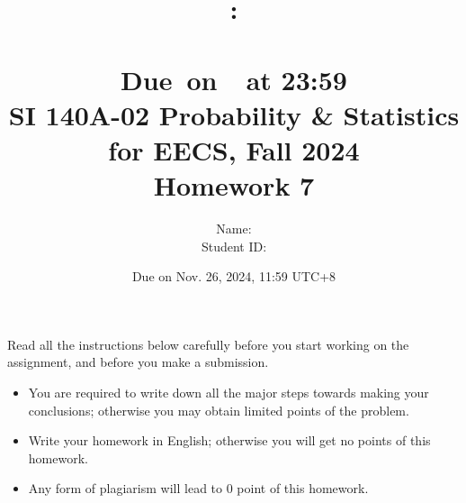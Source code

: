 \documentclass[a4paper]{article}
\title{
    \vspace{2in}
    \textmd{\textbf{\hmwkClass:\\  \hmwkTitle}}\\
    \normalsize\vspace{0.1in}\small{Due\ on\ \hmwkDueDate\ at 23:59}\\
	\vspace{4in}
}
\author{
	Name: \textbf{\hmwkAuthorName} \\
	Student ID: \hmwkAuthorID}
\date{}
\begin{document}

\date{
Due on Nov. 26, 2024, 11:59 UTC+8}
\title{SI 140A-02  Probability \& Statistics for EECS, Fall 2024 \\
Homework 7}
\maketitle
Read all the instructions below carefully before you start working on the assignment, and before you make a submission.
\begin{itemize}
    \item You are required to write down all the major steps towards making your conclusions; otherwise you may obtain limited points of the problem.
    \item Write your homework in English; otherwise you will get no points of this homework.
    \item Any form of plagiarism will lead to $0$ point of this homework. 
\end{itemize}
\newpage
\end{document}
